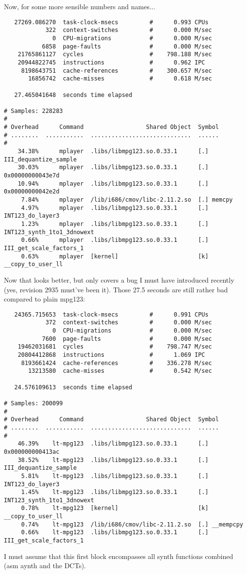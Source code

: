 \documentclass[a4paper,12pt]{scrartcl}
\begin{document}
Now, for some more sensible numbers and names...
\begin{verbatim}
   27269.086270  task-clock-msecs         #      0.993 CPUs 
            322  context-switches         #      0.000 M/sec
              0  CPU-migrations           #      0.000 M/sec
           6858  page-faults              #      0.000 M/sec
    21765861127  cycles                   #    798.188 M/sec
    20944822745  instructions             #      0.962 IPC  
     8198643751  cache-references         #    300.657 M/sec
       16856742  cache-misses             #      0.618 M/sec

   27.465041648  seconds time elapsed

# Samples: 228283
#
# Overhead      Command                  Shared Object  Symbol
# ........  ...........  .............................  ......
#
    34.38%      mplayer  .libs/libmpg123.so.0.33.1      [.] III_dequantize_sample
    30.03%      mplayer  .libs/libmpg123.so.0.33.1      [.] 0x00000000043e7d
    10.94%      mplayer  .libs/libmpg123.so.0.33.1      [.] 0x00000000042e2d
     7.84%      mplayer  /lib/i686/cmov/libc-2.11.2.so  [.] memcpy
     4.97%      mplayer  .libs/libmpg123.so.0.33.1      [.] INT123_do_layer3
     1.23%      mplayer  .libs/libmpg123.so.0.33.1      [.] INT123_synth_1to1_3dnowext
     0.66%      mplayer  .libs/libmpg123.so.0.33.1      [.] III_get_scale_factors_1
     0.63%      mplayer  [kernel]                       [k] __copy_to_user_ll
\end{verbatim}
Now that looks better, but only covers a bug I must have introduced recently (yes, revision 2935 must've been it). Those 27.5 seconds are still rather bad compared to plain mpg123:
\begin{verbatim}
   24365.715653  task-clock-msecs         #      0.991 CPUs 
            372  context-switches         #      0.000 M/sec
              0  CPU-migrations           #      0.000 M/sec
           7600  page-faults              #      0.000 M/sec
    19462031681  cycles                   #    798.747 M/sec
    20804412868  instructions             #      1.069 IPC  
     8193661424  cache-references         #    336.278 M/sec
       13213580  cache-misses             #      0.542 M/sec

   24.576109613  seconds time elapsed

# Samples: 200099
#
# Overhead      Command                  Shared Object  Symbol
# ........  ...........  .............................  ......
#
    46.39%    lt-mpg123  .libs/libmpg123.so.0.33.1      [.] 0x000000000413ac
    38.52%    lt-mpg123  .libs/libmpg123.so.0.33.1      [.] III_dequantize_sample
     5.81%    lt-mpg123  .libs/libmpg123.so.0.33.1      [.] INT123_do_layer3
     1.45%    lt-mpg123  .libs/libmpg123.so.0.33.1      [.] INT123_synth_1to1_3dnowext
     0.78%    lt-mpg123  [kernel]                       [k] __copy_to_user_ll
     0.74%    lt-mpg123  /lib/i686/cmov/libc-2.11.2.so  [.] __mempcpy
     0.66%    lt-mpg123  .libs/libmpg123.so.0.33.1      [.] III_get_scale_factors_1
\end{verbatim}
I must assume that this first block encompasses all synth functions combined (asm aynth and the DCTs).
\end{document}

